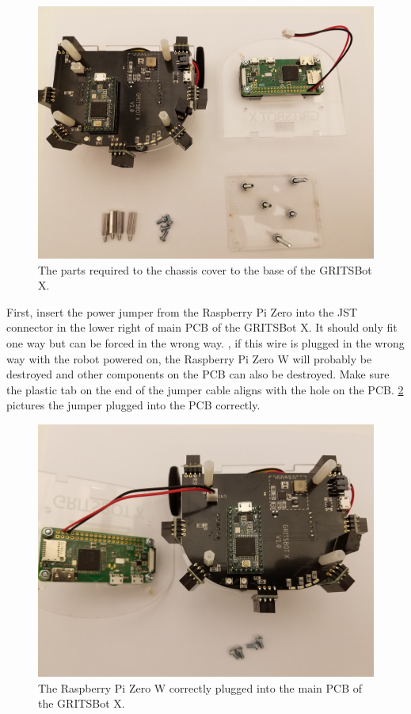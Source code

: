 \begin{figure}[h!]
\centering
\includegraphics[width=0.65\columnwidth, keepaspectratio]{./figs/20190107_092608.jpg}
\caption{The parts required to the chassis cover to the base of the GRITSBot X.}
\label{fig:finalChassisMaterials}
\end{figure}

First, insert the power jumper from the Raspberry Pi Zero into the JST connector in the lower right of main PCB of the GRITSBot X. It should only fit one way but can be forced in the wrong way. {\color{red}{Note}}, if this wire is plugged in the wrong way with the robot powered on, the Raspberry Pi Zero W will probably be destroyed and other components on the PCB can also be destroyed. Make sure the plastic tab on the end of the jumper cable aligns with the hole on the PCB. \cref{fig:pluggedPi} pictures the jumper plugged into the PCB correctly.

\begin{figure}[h!]
\centering
\includegraphics[width=0.65\columnwidth, keepaspectratio]{./figs/20190107_092139.jpg}
\caption{The Raspberry Pi Zero W correctly plugged into the main PCB of the GRITSBot X.}
\label{fig:pluggedPi}
\end{figure}

